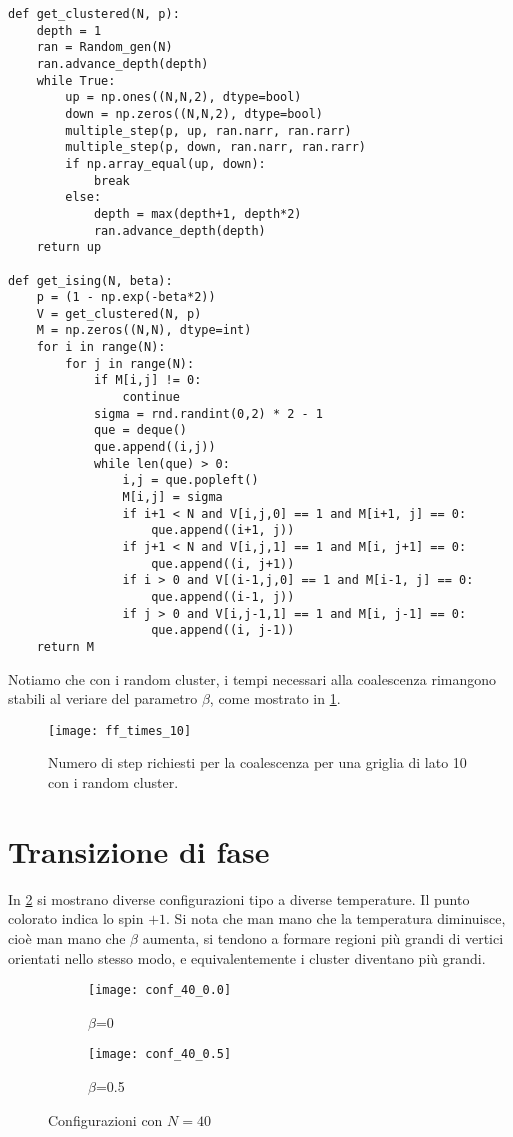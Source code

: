 \documentclass[]{marticle}
\begin{document}
\begin{lstlisting}
def get_clustered(N, p):
    depth = 1
    ran = Random_gen(N)
    ran.advance_depth(depth)
    while True:
        up = np.ones((N,N,2), dtype=bool)
        down = np.zeros((N,N,2), dtype=bool)
        multiple_step(p, up, ran.narr, ran.rarr)
        multiple_step(p, down, ran.narr, ran.rarr)
        if np.array_equal(up, down):
            break
        else:
            depth = max(depth+1, depth*2)
            ran.advance_depth(depth)
    return up

def get_ising(N, beta):
    p = (1 - np.exp(-beta*2))
    V = get_clustered(N, p)
    M = np.zeros((N,N), dtype=int)
    for i in range(N):
        for j in range(N):
            if M[i,j] != 0:
                continue
            sigma = rnd.randint(0,2) * 2 - 1
            que = deque()
            que.append((i,j))
            while len(que) > 0:
                i,j = que.popleft()
                M[i,j] = sigma
                if i+1 < N and V[i,j,0] == 1 and M[i+1, j] == 0:
                    que.append((i+1, j))
                if j+1 < N and V[i,j,1] == 1 and M[i, j+1] == 0:
                    que.append((i, j+1))
                if i > 0 and V[(i-1,j,0] == 1 and M[i-1, j] == 0:
                    que.append((i-1, j))
                if j > 0 and V[i,j-1,1] == 1 and M[i, j-1] == 0:
                    que.append((i, j-1))
    return M
\end{lstlisting}

Notiamo che con i random cluster, i tempi necessari alla coalescenza rimangono
stabili al veriare del parametro $\beta$, come mostrato in \ref{fig:plot2}.
\begin{figure}[h!]
\caption{Numero di step richiesti per la coalescenza per una griglia di lato 10
    con i random cluster.}
\texttt{[image: ff\_times\_10]}
\label{fig:plot2}
\centering
\end{figure}

\section{Transizione di fase}
In \ref{fig:plot3} si mostrano diverse configurazioni tipo a diverse
temperature. Il punto colorato indica lo spin $+1$. Si nota che man mano che la
temperatura diminuisce, cio\`e man mano che $\beta$ aumenta, si tendono a
formare regioni pi\`u grandi di vertici orientati nello stesso modo, e
equivalentemente i cluster diventano pi\`u grandi. 
\begin{figure}[h!]
\begin{subfigure}{.5\textwidth}
  \centering
  \texttt{[image: conf\_40\_0.0]}
  \caption{$\beta$=0}
\end{subfigure}%
\begin{subfigure}{.5\textwidth}
  \centering
  \texttt{[image: conf\_40\_0.5]}
  \caption{$\beta$=0.5}
\end{subfigure}%
\caption{Configurazioni con $N=40$}
\label{fig:plot3}
\centering
\end{figure}
\end{document}
